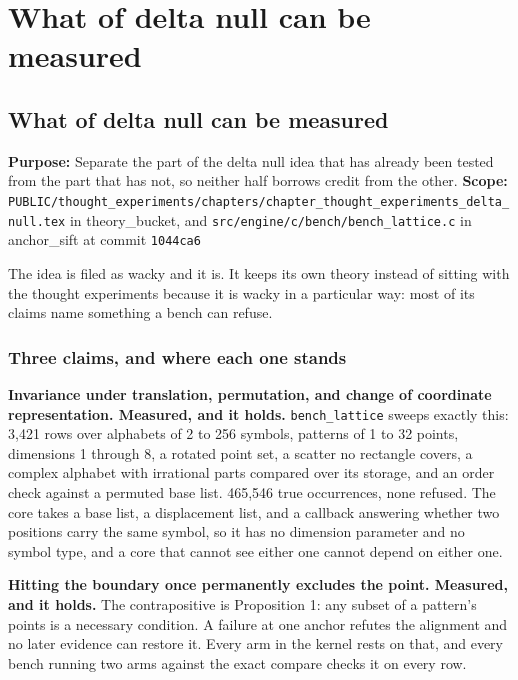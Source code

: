 \chapter{What of delta null can be measured}

\section{What of delta null can be measured}

\textbf{Purpose:} Separate the part of the delta null idea that has already been tested from the part that has not, so neither half borrows credit from the other. \textbf{Scope:} \texttt{PUBLIC/\allowbreak{}thought\_\allowbreak{}experiments/\allowbreak{}chapters/\allowbreak{}chapter\_\allowbreak{}thought\_\allowbreak{}experiments\_\allowbreak{}delta\_\allowbreak{}null.\allowbreak{}tex} in theory\_bucket, and \texttt{src/\allowbreak{}engine/\allowbreak{}c/\allowbreak{}bench/\allowbreak{}bench\_\allowbreak{}lattice.\allowbreak{}c} in anchor\_sift at commit \texttt{1044ca6}

The idea is filed as wacky and it is. It keeps its own theory instead of sitting with the thought experiments because it is wacky in a particular way: most of its claims name something a bench can refuse.

\subsection{Three claims, and where each one stands}

\textbf{Invariance under translation, permutation, and change of coordinate representation. Measured, and it holds.} \texttt{bench\_\allowbreak{}lattice} sweeps exactly this: 3,421 rows over alphabets of 2 to 256 symbols, patterns of 1 to 32 points, dimensions 1 through 8, a rotated point set, a scatter no rectangle covers, a complex alphabet with irrational parts compared over its storage, and an order check against a permuted base list. 465,546 true occurrences, none refused. The core takes a base list, a displacement list, and a callback answering whether two positions carry the same symbol, so it has no dimension parameter and no symbol type, and a core that cannot see either one cannot depend on either one.

\textbf{Hitting the boundary once permanently excludes the point. Measured, and it holds.} The contrapositive is Proposition 1: any subset of a pattern's points is a necessary condition. A failure at one anchor refutes the alignment and no later evidence can restore it. Every arm in the kernel rests on that, and every bench running two arms against the exact compare checks it on every row.

